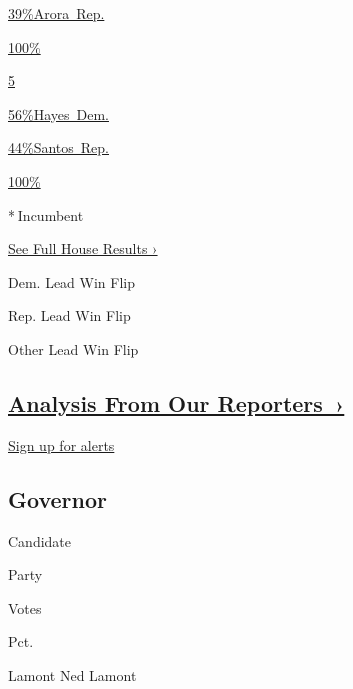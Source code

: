 \href{https://www.nytimes3xbfgragh.onion/elections/results/connecticut-house-district-4}{
39\%Arora~Rep.}

\href{https://www.nytimes3xbfgragh.onion/elections/results/connecticut-house-district-4}{100\%}

\href{https://www.nytimes3xbfgragh.onion/elections/results/connecticut-house-district-4}{}

\href{https://www.nytimes3xbfgragh.onion/elections/results/connecticut-house-district-5}{5}

\href{https://www.nytimes3xbfgragh.onion/elections/results/connecticut-house-district-5}{
56\%Hayes~Dem.}

\href{https://www.nytimes3xbfgragh.onion/elections/results/connecticut-house-district-5}{
44\%Santos~Rep.}

\href{https://www.nytimes3xbfgragh.onion/elections/results/connecticut-house-district-5}{100\%}

\href{https://www.nytimes3xbfgragh.onion/elections/results/connecticut-house-district-5}{}

* Incumbent~

\href{https://www.nytimes3xbfgragh.onion/interactive/2018/11/06/us/elections/results-house-elections.html}{See
Full House Results ›}

Dem. Lead Win Flip

Rep. Lead Win Flip

Other Lead Win Flip

\hypertarget{analysis-from-our-reporters-}{%
\subsection{\texorpdfstring{\href{https://www.nytimes3xbfgragh.onion/interactive/2018/11/06/us/elections/live-midterm-election-analysis-updates.html}{Analysis
From Our
Reporters~›}}{Analysis From Our Reporters~›}}\label{analysis-from-our-reporters-}}

\protect\hyperlink{}{Sign up for alerts}

\hypertarget{governor}{%
\subsection{Governor}\label{governor}}

Candidate

Party

Votes

Pct.

 Lamont Ned Lamont

